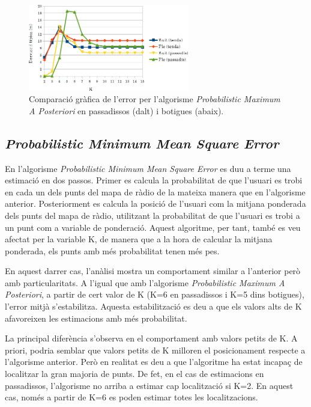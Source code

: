 \begin{figure}[ht]
\begin{center}
\includegraphics[width=7cm]{imatges/map_desviacio.png}
\caption{Comparació gràfica de l'error per l'algorisme \textit{Probabilistic Maximum A Posteriori} en passadissos (dalt) i botigues (abaix).}
\label{fig:grafic_desviacio_MAP}
\end{center}
\end{figure}

\subsection{\textit{Probabilistic Minimum Mean Square Error}}

En l'algorisme \textit{Probabilistic Minimum Mean Square Error} es duu a terme una estimació en dos passos. Primer es calcula la probabilitat de que l'usuari es trobi en cada un dels punts del mapa de ràdio de la mateixa manera que en l'algorisme anterior. Posteriorment es calcula la posició de l'usuari com la mitjana ponderada dels punts del mapa de ràdio, utilitzant la probabilitat de que l'usuari es trobi a un punt com a variable de ponderació. Aquest algoritme, per tant, també es veu afectat per la variable K, de manera que a la hora de calcular la mitjana ponderada, els punts amb més probabilitat tenen més pes.

En aquest darrer cas, l'anàlisi mostra un comportament similar a l'anterior però amb particularitats. A l'igual que amb l'algorisme \textit{Probabilistic Maximum A Posteriori}, a partir de cert valor de K (K=6 en passadissos i K=5 dins botigues), l'error mitjà s'estabilitza. Aquesta estabilització es deu a que els valors alts de K afavoreixen les estimacions amb més probabilitat.

La principal diferència s'observa en el comportament amb valors petits de K. A priori, podria semblar que valors petits de K milloren el posicionament respecte a l'algorisme anterior. Però  en realitat es deu a que l'algoritme ha estat incapaç de localitzar la gran majoria de punts. De fet, en el cas de estimacions en passadissos, l'algorisme no arriba a estimar cap localització si K=2. En aquest cas, només a partir de K=6 es poden estimar totes les localitzacions.

